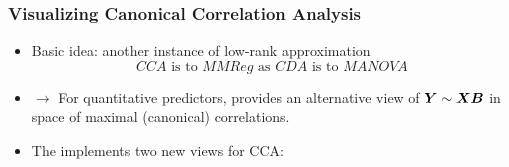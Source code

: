 \begin{frame}
  \frametitle{Visualizing Canonical Correlation Analysis}

  \begin{itemize}
  	\item Basic idea: another instance of low-rank approximation
	\begin{equation*}
	 CCA \mbox{ is to } MMReg \mbox{ as } CDA \mbox{ is to } MANOVA
	\end{equation*}
	\item $\rightarrow$ For quantitative predictors, 
	provides an alternative view of $\bm{Y} \sim \bm{X} \bm{B}$
	in space of maximal (canonical) correlations.
	\item The  implements two new views for CCA:
  \end{itemize}


\end{frame}
